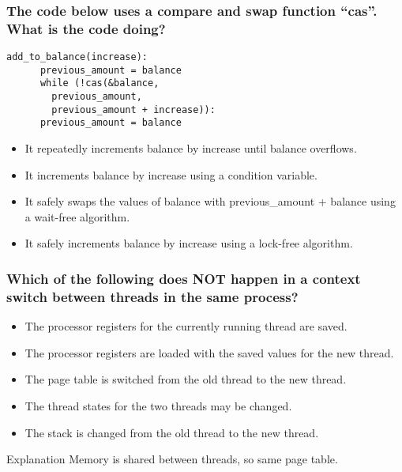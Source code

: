 \documentclass{beamer}
\begin{document}
\begin{frame}[fragile]
  \frametitle{The code below uses a compare and swap function “cas”. What is the code doing?}
  \begin{lstlisting}[style=customc]
    add_to_balance(increase):
      previous_amount = balance
      while (!cas(&balance,
        previous_amount,
        previous_amount + increase)):
      previous_amount = balance
  \end{lstlisting}
  \begin{itemize}
    \item It repeatedly increments balance by increase until balance overflows.
    \item It increments balance by increase using a condition variable.
    \item It safely swaps the values of balance with previous\_amount + balance using a wait-free algorithm.
    \item<alert@2> It safely increments balance by increase using a lock-free algorithm.
  \end{itemize}
\end{frame}
\begin{frame}
  \frametitle{Which of the following does NOT happen in a context switch between threads in the same process?}
  \begin{itemize}
    \item The processor registers for the currently running thread are saved.
    \item The processor registers are loaded with the saved values for the new thread.
    \item<alert@2> The page table is switched from the old thread to the new thread.
    \item The thread states for the two threads may be changed.
    \item The stack is changed from the old thread to the new thread.  
  \end{itemize}
  \pause
  \begin{block}{Explanation}
    Memory is shared between threads, so same page table.
  \end{block}
\end{frame}
\end{document}
